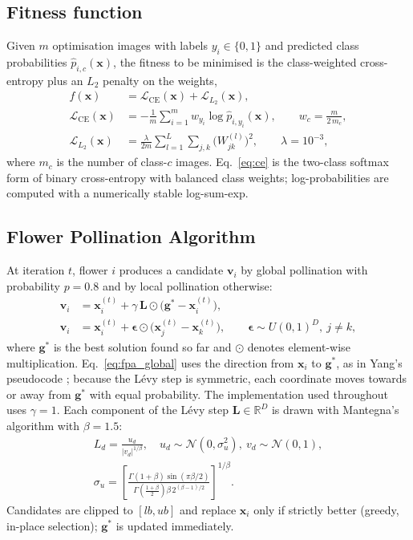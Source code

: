 \documentclass[10pt,letterpaper]{article}
\newcommand{\R}{\mathbb{R}}
\begin{document}
\subsection{Fitness function}
Given $m$ optimisation images with labels $y_i\in\{0,1\}$ and predicted class probabilities $\hat p_{i,c}(\mathbf{x})$, the fitness to be minimised is the class-weighted cross-entropy plus an $L_2$ penalty on the weights,
\begin{align}
f(\mathbf{x}) &= \mathcal{L}_{\mathrm{CE}}(\mathbf{x})+\mathcal{L}_{L_2}(\mathbf{x}),\label{eq:fitness}\\
\mathcal{L}_{\mathrm{CE}}(\mathbf{x}) &= -\frac{1}{m}\sum_{i=1}^{m} w_{y_i}\log \hat p_{i,y_i}(\mathbf{x}),\qquad w_c=\frac{m}{2\,m_c},\label{eq:ce}\\
\mathcal{L}_{L_2}(\mathbf{x}) &= \frac{\lambda}{2m}\sum_{l=1}^{L}\sum_{j,k}\bigl(W^{(l)}_{jk}\bigr)^2,\qquad \lambda=10^{-3},\label{eq:l2}
\end{align}
where $m_c$ is the number of class-$c$ images. Eq.~\eqref{eq:ce} is the two-class softmax form of binary cross-entropy with balanced class weights; log-probabilities are computed with a numerically stable log-sum-exp.

\subsection{Flower Pollination Algorithm}
At iteration $t$, flower $i$ produces a candidate $\mathbf{v}_i$ by global pollination with probability $p=0.8$ and by local pollination otherwise:
\begin{align}
\mathbf{v}_i &= \mathbf{x}_i^{(t)}+\gamma\,\mathbf{L}\odot\bigl(\mathbf{g}^{*}-\mathbf{x}_i^{(t)}\bigr),\label{eq:fpa_global}\\
\mathbf{v}_i &= \mathbf{x}_i^{(t)}+\bm{\epsilon}\odot\bigl(\mathbf{x}_j^{(t)}-\mathbf{x}_k^{(t)}\bigr),\qquad \bm{\epsilon}\sim U(0,1)^D,\ j\neq k,\label{eq:fpa_local}
\end{align}
where $\mathbf{g}^{*}$ is the best solution found so far and $\odot$ denotes element-wise multiplication. Eq.~\eqref{eq:fpa_global} uses the direction from $\mathbf{x}_i$ to $\mathbf{g}^{*}$, as in Yang's pseudocode \citep{yang2012fpa}; because the Lévy step is symmetric, each coordinate moves towards or away from $\mathbf{g}^{*}$ with equal probability. The implementation used throughout uses $\gamma=1$. Each component of the Lévy step $\mathbf{L}\in\R^D$ is drawn with Mantegna's algorithm \citep{mantegna1994} with $\beta=1.5$:
\begin{equation}
\begin{gathered}
L_d=\frac{u_d}{|v_d|^{1/\beta}},\quad u_d\sim\mathcal{N}(0,\sigma_u^2),\ v_d\sim\mathcal{N}(0,1),\\[2pt]
\sigma_u=\left[\frac{\Gamma(1+\beta)\sin(\pi\beta/2)}{\Gamma\!\left(\frac{1+\beta}{2}\right)\beta\,2^{(\beta-1)/2}}\right]^{1/\beta}.
\end{gathered}
\label{eq:mantegna}
\end{equation}
Candidates are clipped to $[lb,ub]$ and replace $\mathbf{x}_i$ only if strictly better (greedy, in-place selection); $\mathbf{g}^{*}$ is updated immediately.
\end{document}
